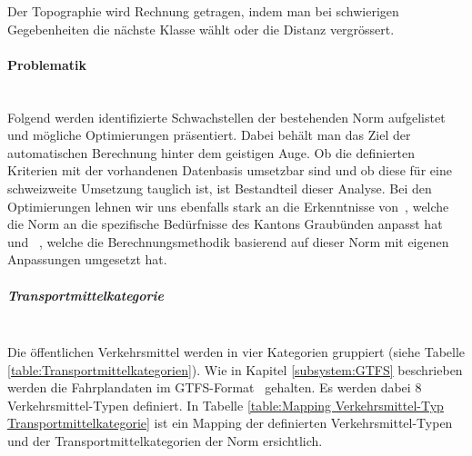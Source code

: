 Der Topographie wird Rechnung getragen, indem man bei schwierigen Gegebenheiten die nächste Klasse wählt oder die Distanz vergrössert.

\paragraph{Problematik}~\\
\label{Schweizer Norm 640 290:Problematik}
Folgend werden identifizierte Schwachstellen der bestehenden Norm aufgelistet und mögliche Optimierungen präsentiert.
Dabei behält man das Ziel der automatischen Berechnung hinter dem geistigen Auge.
Ob die definierten Kriterien mit der vorhandenen Datenbasis umsetzbar sind und ob diese für eine schweizweite Umsetzung tauglich ist, ist Bestandteil dieser Analyse.
Bei den Optimierungen lehnen wir uns ebenfalls stark an die Erkenntnisse von~\cite{oev-guteklasse-gr}, welche die Norm an die spezifische Bedürfnisse des Kantons Graubünden anpasst hat und ~\cite{berechnung_are}, welche die Berechnungsmethodik basierend auf dieser Norm mit eigenen Anpassungen umgesetzt hat.

\subparagraph{Transportmittelkategorie}~\\
Die öffentlichen Verkehrsmittel werden in vier Kategorien gruppiert (siehe Tabelle \ref{table:Transportmittelkategorien}).
Wie in Kapitel \ref{subsystem:GTFS} beschrieben werden die Fahrplandaten im \acs{GTFS}-Format~\cite{gtfs_spec} gehalten. 
Es werden dabei 8 Verkehrsmittel-Typen definiert.
In Tabelle \ref{table:Mapping Verkehrsmittel-Typ Transportmittelkategorie} ist ein Mapping der definierten Verkehrsmittel-Typen und der Transportmittelkategorien der Norm ersichtlich.

